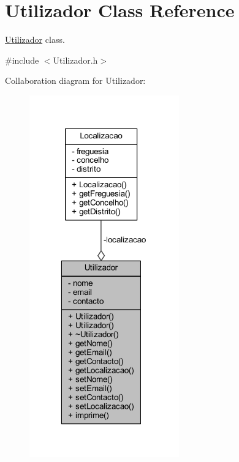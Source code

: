 \hypertarget{class_utilizador}{}\section{Utilizador Class Reference}
\label{class_utilizador}


\hyperlink{class_utilizador}{Utilizador} class.  




{\ttfamily \#include $<$Utilizador.\+h$>$}



Collaboration diagram for Utilizador\+:
\nopagebreak
\begin{figure}[H]
\begin{center}
\leavevmode
\includegraphics[width=183pt]{class_utilizador__coll__graph}
\end{center}
\end{figure}
